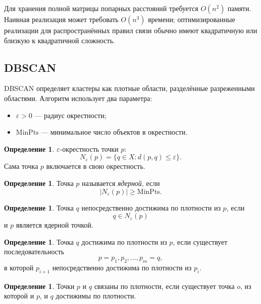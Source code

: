 \documentclass[12pt,a4paper]{article}
\theoremstyle{definition}
\newtheorem{definition}[theorem]{Определение}
\theoremstyle{remark}
\begin{document}
Для хранения полной матрицы попарных расстояний требуется
$O(n^2)$ памяти. Наивная реализация может требовать $O(n^3)$ времени;
оптимизированные реализации для распространённых правил связи обычно
имеют квадратичную или близкую к квадратичной сложность.

\subsection{DBSCAN}

DBSCAN определяет кластеры как плотные области, разделённые разреженными
областями. Алгоритм использует два параметра:

\begin{itemize}
    \item $\varepsilon>0$ --- радиус окрестности;
    \item $\mathrm{MinPts}$ --- минимальное число объектов в окрестности.
\end{itemize}

\begin{definition}
$\varepsilon$-окрестность точки $p$:
\[
    N_\varepsilon(p)
    =
    \{q\in X:d(p,q)\leq\varepsilon\}.
\]
Сама точка $p$ включается в свою окрестность.
\end{definition}

\begin{definition}
Точка $p$ называется \emph{ядерной}, если
\[
    |N_\varepsilon(p)|
    \geq
    \mathrm{MinPts}.
\]
\end{definition}

\begin{definition}
Точка $q$ непосредственно достижима по плотности из $p$, если
\[
    q\in N_\varepsilon(p)
\]
и $p$ является ядерной точкой.
\end{definition}

\begin{definition}
Точка $q$ достижима по плотности из $p$, если существует последовательность
\[
    p=p_1,p_2,\ldots,p_m=q,
\]
в которой $p_{i+1}$ непосредственно достижима по плотности из $p_i$.
\end{definition}

\begin{definition}
Точки $p$ и $q$ связаны по плотности, если существует точка $o$, из которой
и $p$, и $q$ достижимы по плотности.
\end{definition}
\end{document}
